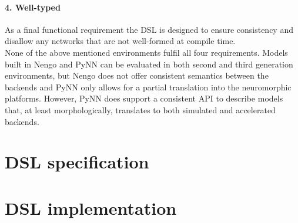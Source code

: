 \documentclass[report.tex]{subfiles}
\begin{document}
\paragraph{4. Well-typed}
As a final functional requirement the \gls{DSL} is designed to ensure
consistency and disallow any networks that are not well-formed at
compile time.
\\[0.4cm]
\noindent
None of the above mentioned environments fulfil all four requirements.
Models built in Nengo and PyNN can be evaluated
in both second and third generation environments, but Nengo does not 
offer consistent semantics between the backends and PyNN only allows
for a partial translation into the neuromorphic platforms.
However, PyNN does support a consistent \gls{API} to describe models that, at
least morphologically, translates to both simulated and accelerated 
backends.


\section{DSL specification} \label{sec:volr}


\section{DSL implementation} \label{sec:implementation}

\end{document}
